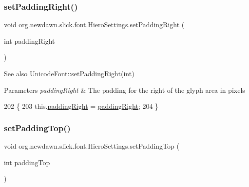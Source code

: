 \subsubsection{\texorpdfstring{set\+Padding\+Right()}{setPaddingRight()}}
{\footnotesize\ttfamily void org.\+newdawn.\+slick.\+font.\+Hiero\+Settings.\+set\+Padding\+Right (\begin{DoxyParamCaption}\item[{int}]{padding\+Right }\end{DoxyParamCaption})\hspace{0.3cm}{\ttfamily [inline]}}

\begin{DoxySeeAlso}{See also}
\mbox{\hyperlink{classorg_1_1newdawn_1_1slick_1_1_unicode_font_ae2a1a2e1a175ea26c748a41efa3578a5}{Unicode\+Font\+::set\+Padding\+Right(int)}}
\end{DoxySeeAlso}

\begin{DoxyParams}{Parameters}
{\em padding\+Right} & The padding for the right of the glyph area in pixels \\
\hline
\end{DoxyParams}

\begin{DoxyCode}
202                                                   \{
203         this.\mbox{\hyperlink{classorg_1_1newdawn_1_1slick_1_1font_1_1_hiero_settings_aca6e7bc5fddecfc1fe6fc94e864f05bc}{paddingRight}} = \mbox{\hyperlink{classorg_1_1newdawn_1_1slick_1_1font_1_1_hiero_settings_aca6e7bc5fddecfc1fe6fc94e864f05bc}{paddingRight}};
204     \}
\end{DoxyCode}
\mbox{\label{classorg_1_1newdawn_1_1slick_1_1font_1_1_hiero_settings_ab50154b8b80727a332d0e101ada84e6d}} 
\subsubsection{\texorpdfstring{set\+Padding\+Top()}{setPaddingTop()}}
{\footnotesize\ttfamily void org.\+newdawn.\+slick.\+font.\+Hiero\+Settings.\+set\+Padding\+Top (\begin{DoxyParamCaption}\item[{int}]{padding\+Top }\end{DoxyParamCaption})\hspace{0.3cm}{\ttfamily [inline]}}


